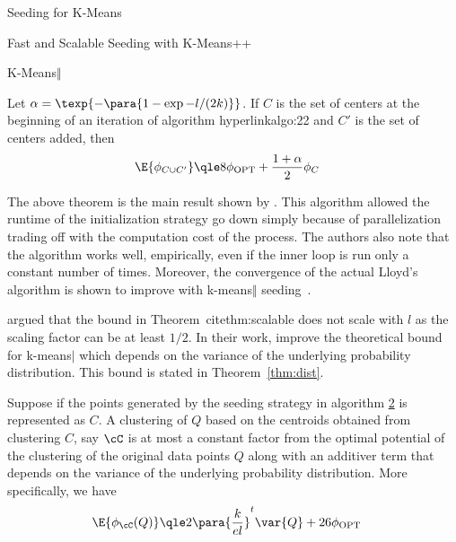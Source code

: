 \documentclass[10pt]{article}
\newcommand{\opt}[1]{#1_{\text{OPT}}}
\begin{document}
\begin{psection}{Seeding for K-Means}
\begin{psubsection}{Fast and Scalable Seeding with K-Means++}
\begin{algo}[0.9\textwidth]{K-Means$\Vert$}
        \end{algo}

        \begin{theorem}%
            \label{thm:scalable-bound}
            Let $\alpha = \texp{- \para{1 - \exp{-l/(2k)}}}$. If $C$ is the set of
            centers at the beginning of an iteration of algorithm hyperlink{algo:2}{2}
            and $C'$ is the set of centers added, then
            \begin{align*}
                \E{\phi_{C \cup C'}}
                &\qle 8 \opt{\phi} + \frac{1 + \alpha}{2} \phi_C
            \end{align*}
        \end{theorem}

        The above theorem is the main result shown by \citet{scalable-kmeanspp}. This
        algorithm allowed the runtime of the initialization strategy go down simply
        because of parallelization trading off with the computation cost of the
        process. The authors also note that the algorithm works well, empirically, even
        if the inner loop is run only a constant number of times.  Moreover, the
        convergence of the actual Lloyd's algorithm is shown to improve with
        k-means$\Vert$ seeding~\cite{scalable-kmeanspp}.
        
        \citet{dist-kmeanspp} argued that the bound in Theorem~cite{thm:scalable} does
        not scale with $l$ as the scaling factor can be at least $1/2$. In their work,
        \citet{dist-kmeanspp} improve the theoretical bound for k-means$\vert$ which
        depends on the variance of the underlying probability distribution. This bound
        is stated in Theorem~\ref{thm:dist}.

        \begin{theorem}%
            \label{thm:dist}
            Suppose if the points generated by the seeding strategy in algorithm
            \hyperlink{algo:2}{2} is represented as $C$. A clustering of $Q$ based on
            the centroids obtained from clustering $C$, say $\cC$ is at most a constant 
            factor from the optimal potential of the clustering of the original data 
            points $Q$ along with an additiver term that depends on the variance of the
            underlying probability distribution. More specifically, we have
            \begin{align*}
                \E{\phi_\cC(Q)}
                &\qle 2 \para{\frac{k}{el}}^t \var{Q} + 26 \opt{\phi}
            \end{align*}
        \end{theorem}


\end{psubsection}
\end{psection}
\end{document}
